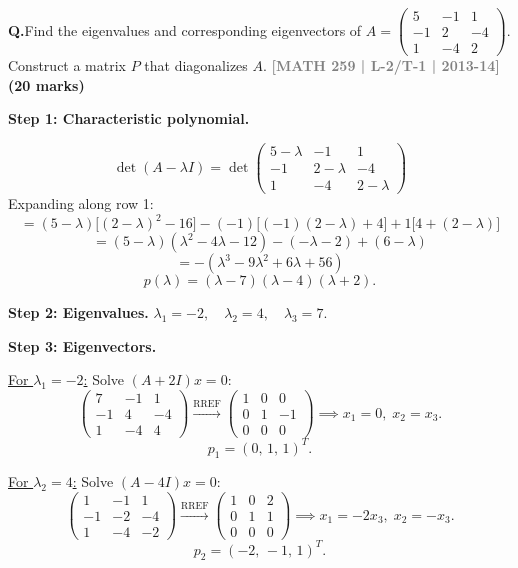 \documentclass[12pt,a3paper]{article}
\newcommand{\yr}[1]{\hfill\textcolor{gray}{\small\textbf{[#1]}}}
\newcommand{\mk}[1]{\textcolor{orange!70!black}{\small\textbf{(#1 marks)}}}
\newcounter{qnum}
\newcommand{\Q}[1]{%
  \needspace{4\baselineskip}
  \refstepcounter{qnum}
  \vspace{6pt}
  \noindent\textbf{Q\theqnum.}\enspace #1\par
}
\begin{document}
\Q{Find the eigenvalues and corresponding eigenvectors of $A = \begin{pmatrix} 5 & -1 & 1 \\ -1 & 2 & -4 \\ 1 & -4 & 2 \end{pmatrix}$. Construct a matrix $P$ that diagonalizes $A$.
\yr{MATH 259 | L-2/T-1 | 2013-14} \mk{20}}

\begin{tcolorbox}[enhanced,breakable,
  colback=cE!4,colframe=cE,boxrule=0.8pt,arc=5pt,
  title={\textbf{Answer --- Eigenvalues, Eigenvectors \& Diagonalization}},
  fonttitle=\bfseries\color{white},colbacktitle=cE]

\textbf{Step 1: Characteristic polynomial.}

\[
\det(A-\lambda I)=\det\begin{pmatrix}5-\lambda&-1&1\\-1&2-\lambda&-4\\1&-4&2-\lambda\end{pmatrix}
\]
Expanding along row 1:
\[
=(5-\lambda)\bigl[(2-\lambda)^2-16\bigr]-(-1)\bigl[(-1)(2-\lambda)+4\bigr]+1\bigl[4+(2-\lambda)\bigr]
\]
\[
=(5-\lambda)(\lambda^2-4\lambda-12)-(-\lambda-2)+(6-\lambda)
\]
\[
=-({\lambda^3-9\lambda^2+6\lambda+56})
\]
\[
\boxed{p(\lambda)=(\lambda-7)(\lambda-4)(\lambda+2).}
\]

\textbf{Step 2: Eigenvalues.} $\lambda_1=-2,\quad\lambda_2=4,\quad\lambda_3=7$.

\medskip
\textbf{Step 3: Eigenvectors.}

\underline{For $\lambda_1=-2$:} Solve $(A+2I)x=0$:
\[
\begin{pmatrix}7&-1&1\\-1&4&-4\\1&-4&4\end{pmatrix}
\xrightarrow{\text{RREF}}
\begin{pmatrix}1&0&0\\0&1&-1\\0&0&0\end{pmatrix}
\implies x_1=0,\;x_2=x_3.
\]
\[
p_1=(0,\,1,\,1)^T.
\]

\underline{For $\lambda_2=4$:} Solve $(A-4I)x=0$:
\[
\begin{pmatrix}1&-1&1\\-1&-2&-4\\1&-4&-2\end{pmatrix}
\xrightarrow{\text{RREF}}
\begin{pmatrix}1&0&2\\0&1&1\\0&0&0\end{pmatrix}
\implies x_1=-2x_3,\;x_2=-x_3.
\]
\[
p_2=(-2,\,-1,\,1)^T.
\]


\end{tcolorbox}
\end{document}
